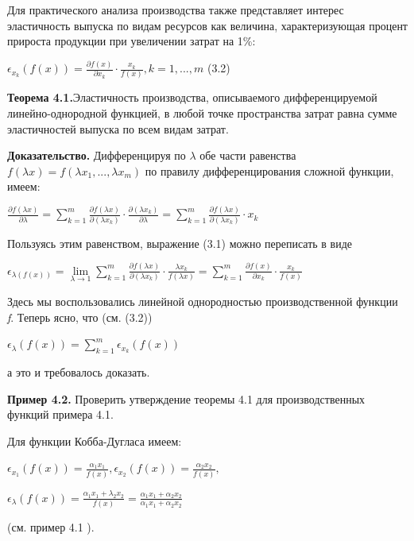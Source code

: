 \documentclass[12pt, 4paper]{book}
\begin{document}
{Для практического анализа производства также представляет интерес эластичность выпуска по видам ресурсов как величина, характеризующая процент прироста продукции при увеличении затрат на 1\%: 
\begin{center}
$\epsilon_{x_k}(f(x))=\frac{\partial f(x)}{\partial x_k}\cdot \frac{ x_k}{f(x)}, k=1,...,m$ (3.2)
\end{center}
\par

\textbf{Теорема 4.1.}Эластичность производства, описываемого дифференцируемой линейно-однородной функцией, в любой точке пространства затрат равна сумме эластичностей выпуска по всем видам затрат. 
\par

\textbf{Доказательство.} Дифференцируя по $\lambda$ обе части равенства $f(\lambda x)=f(\lambda x_1,...,\lambda x_m)$ по правилу дифференцирования сложной функции, имеем: 
\begin{center}
$\frac{\partial f(\lambda x)}{\partial \lambda}=\sum\limits_{k=1}^{m}\frac{\partial f(\lambda x)}{\partial (\lambda x_k)}\cdot \frac{\partial (\lambda x_k)}{\partial \lambda}=\sum\limits_{k=1}^{m}\frac{\partial f (\lambda x)}{\partial (\lambda x_k)}\cdot x_k$
\end{center}
\par

Пользуясь этим равенством, выражение (3.1) можно переписать в виде 
\begin{center}
$\epsilon_{\lambda (f(x))}=\lim\limits_{\lambda \rightarrow 1} \sum\limits_{k=1}^{m}\frac{\partial f(\lambda x)}{\partial ( \lambda x_k)}\cdot \frac{\lambda x_k}{f(\lambda x)}= \sum\limits_{k=1}^{m}\frac{\partial f(x)}{\partial x_k}\cdot \frac{x_k}{f(x)}$
\end{center}
\par

Здесь мы воспользовались линейной однородностью производственной функции \textit{f}. Теперь ясно, что (см. (3.2)) 
\begin{center}
$\epsilon_{\lambda}(f(x))=\sum\limits_{k=1}^{m}\epsilon_{x_k}(f(x))$
\end{center}
а это и требовалось доказать. 
\par

\textbf{Пример 4.2.} Проверить утверждение теоремы 4.1 для производственных функций примера 4.1. 
\par

Для функции Кобба-Дугласа имеем: 
\begin{center}
$\epsilon_{x_1}(f(x))=\frac{\alpha_1 x_1}{f(x)},\epsilon_{x_2}(f(x))=\frac{\alpha_2 x_2}{f(x)},$
\end{center}
\begin{center}
$\epsilon_{\lambda}(f(x))=\frac{\alpha_1 x_1 + \lambda_2 x_2}{f(x)}=\frac{ \alpha_1 x_1+ \alpha_2 x_2}{\alpha_1 x_1+ \alpha_2 x_2}$
\end{center}
(см. пример 4.1 ). 
\par

}
\end{document}
